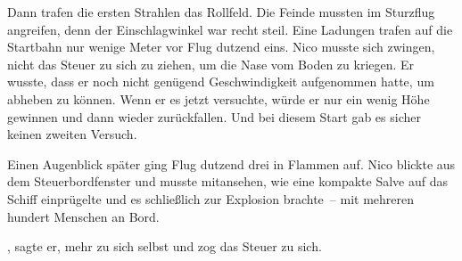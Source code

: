 \par

Dann trafen die ersten Strahlen das Rollfeld. Die Feinde mussten im Sturzflug angreifen, denn der Einschlagwinkel war recht steil. Eine Ladungen trafen auf die Startbahn nur wenige Meter vor Flug dutzend eins. Nico musste sich zwingen, nicht das Steuer zu sich zu ziehen, um die Nase vom Boden zu kriegen. Er wusste, dass er noch nicht genügend Geschwindigkeit aufgenommen hatte, um abheben zu können. Wenn er es jetzt versuchte, würde er nur ein wenig Höhe gewinnen und dann wieder zurückfallen. Und bei diesem Start gab es sicher keinen zweiten Versuch.

\par

Einen Augenblick später ging Flug dutzend drei in Flammen auf. Nico blickte aus dem Steuerbordfenster und musste mitansehen, wie eine kompakte Salve auf das Schiff einprügelte und es schließlich zur Explosion brachte~-- mit mehreren hundert Menschen an Bord.

\par

, sagte er, mehr zu sich selbst und zog das Steuer zu sich.
